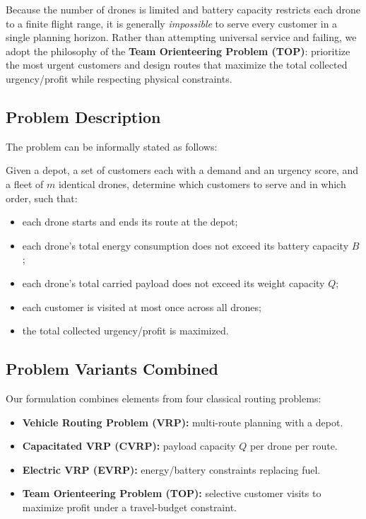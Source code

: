 \documentclass[12pt,a4paper]{article}
\begin{document}
Because the number of drones is limited and battery capacity restricts each drone to a
finite flight range, it is generally \emph{impossible} to serve every customer in a single
planning horizon. Rather than attempting universal service and failing, we adopt the
philosophy of the \textbf{Team Orienteering Problem (TOP)}: prioritize the most urgent
customers and design routes that maximize the total collected urgency/profit while
respecting physical constraints.

\subsection{Problem Description}

The problem can be informally stated as follows:

\begin{tcolorbox}[colback=boxgray,colframe=deepblue]
Given a depot, a set of customers each with a demand and an urgency score, and a fleet of
$m$ identical drones, determine which customers to serve and in which order, such that:
\begin{itemize}[leftmargin=*]
  \item each drone starts and ends its route at the depot;
  \item each drone's total energy consumption does not exceed its battery capacity $B$;
  \item each drone's total carried payload does not exceed its weight capacity $Q$;
  \item each customer is visited at most once across all drones;
  \item the total collected urgency/profit is maximized.
\end{itemize}
\end{tcolorbox}

\subsection{Problem Variants Combined}

Our formulation combines elements from four classical routing problems:

\begin{itemize}
  \item \textbf{Vehicle Routing Problem (VRP):} multi-route planning with a depot.
  \item \textbf{Capacitated VRP (CVRP):} payload capacity $Q$ per drone per route.
  \item \textbf{Electric VRP (EVRP):} energy/battery constraints replacing fuel.
  \item \textbf{Team Orienteering Problem (TOP):} selective customer visits to maximize
  profit under a travel-budget constraint.
\end{itemize}
\end{document}
